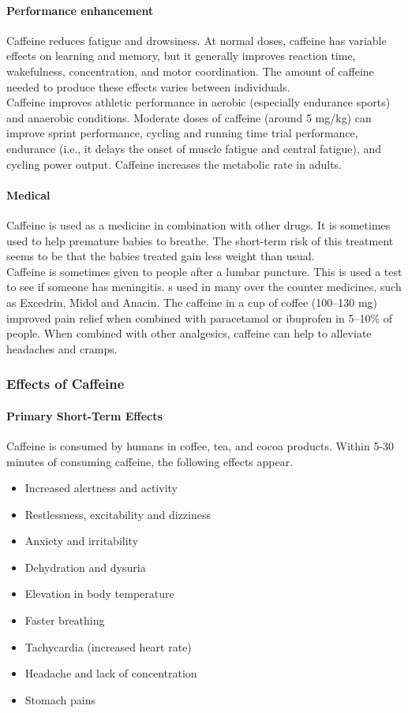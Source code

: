 \documentclass[11pt]{article}
\begin{document}
\paragraph{Performance enhancement \cite{effects1}}
Caffeine reduces fatigue and drowsiness. At normal doses, caffeine has variable effects on learning
and memory, but it generally improves reaction time, wakefulness, concentration, and motor
coordination. The amount of caffeine needed to produce these effects varies between individuals.\\
Caffeine improves athletic performance in aerobic (especially endurance sports) and anaerobic
conditions. Moderate doses of caffeine (around 5 mg/kg) can improve sprint performance, cycling and
running time trial performance, endurance (i.e., it delays the onset of muscle fatigue and central
fatigue), and cycling power output. Caffeine increases the metabolic rate in adults. \cite{caffwiki}
\paragraph{Medical}
Caffeine is used as a medicine in combination with other drugs. It is sometimes used to help
premature babies to breathe. The short-term risk of this treatment seems to be that the babies
treated gain less weight than usual.\\
Caffeine is sometimes given to people after a lumbar puncture. This is used a test to see if someone has
meningitis. s used in many over the counter medicines, such as Excedrin, Midol and Anacin. The
caffeine in a cup of coffee (100–130 mg) improved pain relief when combined with paracetamol or
ibuprofen in 5–10\% of people. When combined with other analgesics, caffeine can help to alleviate
headaches and cramps. \cite{caffwiki}
\subsubsection{Effects of Caffeine}
\paragraph{Primary Short-Term Effects \cite{effects}} Caffeine is consumed by humans in coffee, tea, and cocoa
products. Within 5-30 minutes of consuming caffeine, the following effects appear.
\begin{itemize}
  \item Increased alertness and activity
  \item Restlessness, excitability and dizziness
  \item Anxiety and irritability
  \item Dehydration and dysuria
  \item Elevation in body temperature
  \item Faster breathing
  \item Tachycardia (increased heart rate)
  \item Headache and lack of concentration
  \item Stomach pains
\end{itemize}
\end{document}
